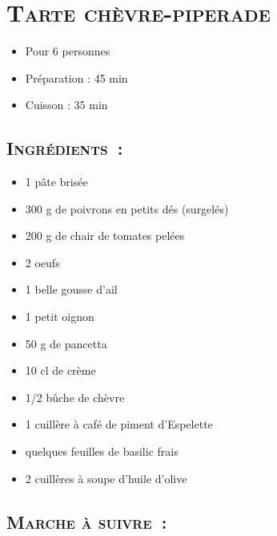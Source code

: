 \section[\normalsize{Tarte ch\`evre-piperade}]{\LARGE{\textsc{Tarte ch\`evre-piperade}}}		%


\begin{itemize}
\item Pour 6 personnes
\item Préparation : 45 min
\item Cuisson : 35 min
\end{itemize}

\subsection*{\textsc{Ingr\'edients~:}}

\begin{itemize}
\item 1 p\^ate bris\'ee
\item 300 g de poivrons en petits d\'es (surgel\'es)
\item 200 g de chair de tomates pel\'ees
\item 2 oeufs
\item 1 belle gousse d'ail
\item 1 petit oignon
\item 50 g de pancetta
\item 10 cl de cr\`eme
\item 1/2 bûche de ch\`evre
\item 1 cuill\`ere \`a caf\'e de piment d'Espelette 
\item quelques feuilles de basilic frais
\item 2 cuill\`eres \`a soupe d'huile d'olive
\end{itemize}


\subsection*{\textsc{Marche \`a suivre~:}}

